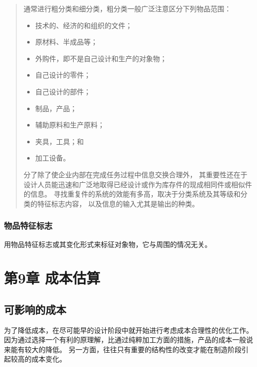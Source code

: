 \documentclass[letterpaper,10pt,english]{sphinxmanual}
\begin{document}
\begin{quote}

通常进行粗分类和细分类，粗分类一般广泛注意区分下列物品范围：
\begin{itemize}
\item {} 
技术的、经济的和组织的文件；

\item {} 
原材料、半成品等；

\item {} 
外购件，即不是自己设计和生产的对象物；

\item {} 
自己设计的零件；

\item {} 
自己设计的部件；

\item {} 
制品，产品；

\item {} 
辅助原料和生产原料；

\item {} 
夹具，工具；和

\item {} 
加工设备。

\end{itemize}

分了除了使企业内部在完成任务过程中信息交换合理外，
其重要性还在于设计人员能迅速和广泛地取得已经设计或作为库存件的现成相同件或相似件的信息。
寻找重复件的系统的效能有多高，取决于分类系统及其等级和分类的特征标志内容，
以及信息的输入尤其是输出的种类。
\end{quote}


\subsection{物品特征标志}
\label{unit8:id9}
用物品特征标志或其变化形式来标征对象物，它与周围的情况无关。


\chapter{第9章 成本估算}
\label{unit9::doc}\label{unit9:id1}

\section{可影响的成本}
\label{unit9:id2}
为了降低成本，在尽可能早的设计阶段中就开始进行考虑成本合理性的优化工作。
因为通过选择一个有利的原理解，比通过纯粹加工方面的措施，产品的成本一般说来能有较大的降低。
另一方面，往往只有重要的结构性的改变才能在制造阶段引起较高的成本变化。
\end{document}
